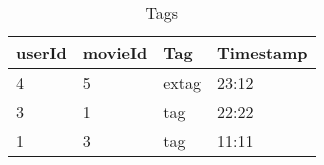 \documentclass{article}
\begin{document}
\begin{table}
 \caption{Tags}
  \centering
  \begin{tabular}{llll}
    \toprule
    userId     & movieId     & Tag & Timestamp \\
    \midrule
    4 & 5  & extag  & 23:12   \\
    3     & 1 & tag     & 22:22 \\
    1     & 3       & tag  & 11:11\\
    \bottomrule
  \end{tabular}
  \label{tab:table2}
\end{table}




  


%
%
%
%
\end{document}

